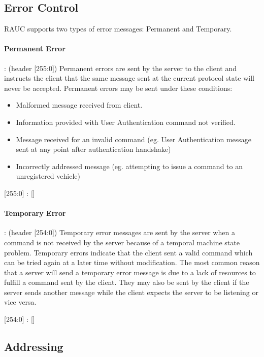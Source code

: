 \subsection{Error Control}
\label{sec:pdus:err}
RAUC supports two types of error messages: Permanent and Temporary.

\paragraph{Permanent Error}: (header [255:0]) Permanent errors are sent by the server to the client and instructs the client that the same message sent at the current protocol state will never be accepted. Permanent errors may be sent under these conditions:
\begin{itemize}
\item Malformed message received from client.
\item Information provided with User Authentication command not verified.
\item Message received for an invalid command (eg. User Authentication message sent at any point after authentication handshake)
\item Incorrectly addressed message (eg. attempting to issue a command to an unregistered vehicle)
  \end{itemize}
  
\begin{center}
{\textsf{[255:0] : []}}
\end{center}

\paragraph{Temporary Error}: (header [254:0]) Temporary error messages are sent by the server when a command is not received by the server because of a temporal machine state problem. Temporary errors indicate that the client sent a valid command which can be tried again at a later time without modification. The most common reason that a server will send a temporary error message is due to a lack of resources to fulfill a command sent by the client. They may also be sent by the client if the server sends another message while the client expects the server to be listening or vice versa.

\begin{center}
{\textsf{[254:0] : []}}
\end{center}

\subsection{Addressing}
\label{sec:pdus:addr}
